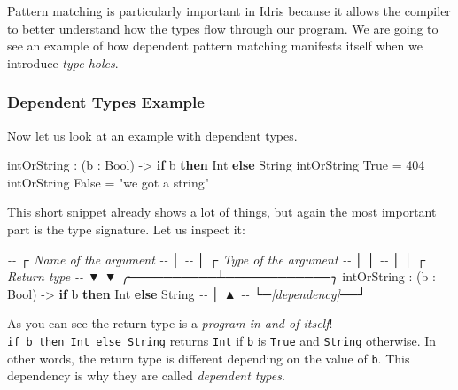 \documentclass[
]{article}
\newenvironment{Shaded}{}{}
\newcommand{\CommentTok}[1]{\textcolor[rgb]{0.38,0.63,0.69}{\textit{#1}}}
\newcommand{\DataTypeTok}[1]{\textcolor[rgb]{0.56,0.13,0.00}{#1}}
\newcommand{\DecValTok}[1]{\textcolor[rgb]{0.25,0.63,0.44}{#1}}
\newcommand{\KeywordTok}[1]{\textcolor[rgb]{0.00,0.44,0.13}{\textbf{#1}}}
\newcommand{\NormalTok}[1]{#1}
\newcommand{\OperatorTok}[1]{\textcolor[rgb]{0.40,0.40,0.40}{#1}}
\newcommand{\OtherTok}[1]{\textcolor[rgb]{0.00,0.44,0.13}{#1}}
\newcommand{\StringTok}[1]{\textcolor[rgb]{0.25,0.44,0.63}{#1}}
\begin{document}
Pattern matching is particularly important in Idris because it allows
the compiler to better understand how the types flow through our
program. We are going to see an example of how dependent pattern
matching\cite{view_from_the_left} manifests itself when we introduce
\emph{type holes}.

\hypertarget{dependent-types-example}{%
\subsubsection{Dependent Types Example}\label{dependent-types-example}}

Now let us look at an example with dependent types.

\begin{Shaded}
\begin{Highlighting}[]
\NormalTok{intOrString }\OperatorTok{:}\NormalTok{ (b }\OperatorTok{:} \DataTypeTok{Bool}\NormalTok{) }\OtherTok{{-}\textgreater{}} \KeywordTok{if}\NormalTok{ b }\KeywordTok{then} \DataTypeTok{Int} \KeywordTok{else} \DataTypeTok{String}
\NormalTok{intOrString }\DataTypeTok{True} \OtherTok{=} \DecValTok{404}
\NormalTok{intOrString }\DataTypeTok{False} \OtherTok{=} \StringTok{"we got a string"}
\end{Highlighting}
\end{Shaded}

This short snippet already shows a lot of things, but again the most
important part is the type signature. Let us inspect it:

\begin{Shaded}
\begin{Highlighting}[]
\CommentTok{{-}{-}             ┌ Name of the argument}
\CommentTok{{-}{-}             │}
\CommentTok{{-}{-}             │    ┌ Type of the argument  }
\CommentTok{{-}{-}             │    │ }
\CommentTok{{-}{-}             │    │                  ┌ Return type}
\CommentTok{{-}{-}             ▼    ▼       ╭──────────┴────────────╮  }
\NormalTok{intOrString }\OperatorTok{:}\NormalTok{ (b }\OperatorTok{:} \DataTypeTok{Bool}\NormalTok{) }\OtherTok{{-}\textgreater{}} \KeywordTok{if}\NormalTok{ b }\KeywordTok{then} \DataTypeTok{Int} \KeywordTok{else} \DataTypeTok{String}
\CommentTok{{-}{-}             │               ▲}
\CommentTok{{-}{-}             └─[dependency]──┘}
\end{Highlighting}
\end{Shaded}

As you can see the return type is a \emph{program in and of itself}!
\texttt{if\ b\ then\ Int\ else\ String} returns \texttt{Int} if
\texttt{b} is \texttt{True} and \texttt{String} otherwise. In other
words, the return type is different depending on the value of
\texttt{b}. This dependency is why they are called \emph{dependent
types}.
\end{document}

